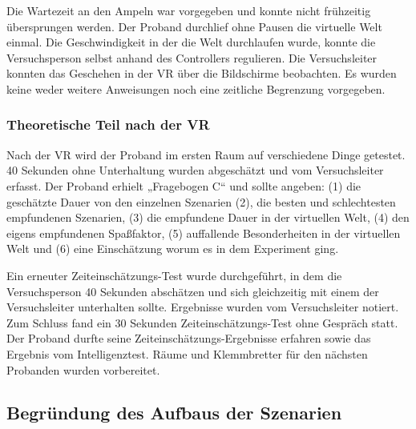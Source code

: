 \documentclass{Paper}
\begin{document}
Die Wartezeit an den Ampeln war vorgegeben und konnte nicht frühzeitig übersprungen werden. Der Proband durchlief ohne Pausen die virtuelle Welt einmal. Die Geschwindigkeit in der die Welt durchlaufen wurde, konnte die
Versuchsperson selbst anhand des Controllers regulieren. Die Versuchsleiter konnten das
Geschehen in der VR über die Bildschirme beobachten. Es wurden
keine weder weitere Anweisungen noch eine zeitliche Begrenzung vorgegeben. 


\subsubsection{Theoretische Teil nach der VR}
Nach der VR wird der Proband im ersten Raum auf verschiedene Dinge getestet.
40 Sekunden ohne
Unterhaltung wurden abgeschätzt und vom Versuchsleiter erfasst. Der Proband erhielt
„Fragebogen C“ und sollte angeben: (1) die geschätzte Dauer von den einzelnen Szenarien
(2), die besten und schlechtesten empfundenen Szenarien, (3) die empfundene Dauer in
der virtuellen Welt, (4) den eigens empfundenen Spaßfaktor, (5) auffallende
Besonderheiten in der virtuellen Welt und (6) eine Einschätzung worum es in dem
Experiment ging.
\par
Ein erneuter Zeiteinschätzungs-Test wurde durchgeführt, in dem die
Versuchsperson 40 Sekunden abschätzen und sich gleichzeitig mit einem der Versuchsleiter
unterhalten sollte. Ergebnisse wurden vom Versuchsleiter notiert. Zum Schluss fand ein 30
Sekunden Zeiteinschätzungs-Test ohne Gespräch statt. 
Der Proband durfte seine Zeiteinschätzungs-Ergebnisse erfahren sowie das Ergebnis vom
Intelligenztest. Räume und Klemmbretter für den nächsten Probanden wurden vorbereitet.
\par
	\subsection{Begründung des Aufbaus der Szenarien}
\end{document}

